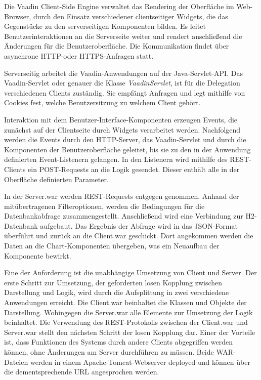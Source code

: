 Die Vaadin Client-Side Engine verwaltet das Rendering der Oberfläche im Web-Browser, durch den Einsatz verschiedener clientseitiger Widgets, die das Gegenstücke zu den serverseitigen Komponenten bilden. Es leitet Benutzerinteraktionen an die Serverseite weiter und rendert anschließend die Änderungen für die Benutzeroberfläche. Die Kommunikation findet über asynchrone HTTP-oder HTTPS-Anfragen statt.

Serverseitig arbeitet die Vaadin-Anwendungen auf der Java-Servlet-API. Das Vaadin-Servlet oder genauer die Klasse \textit{VaadinServlet}, ist für die Delegation verschiedenen Clients zuständig. Sie empfängt Anfragen und legt mithilfe von Cookies fest, welche Benutzersitzung zu welchem Client gehört.

Interaktion mit dem Benutzer-Interface-Komponenten erzeugen Events, die zunächst auf der Clientseite durch Widgets verarbeitet werden. Nachfolgend werden die Events durch den HTTP-Server, das Vaadin-Servlet und durch die Komponenten der Benutzeroberfläche geleitet, bis sie zu den in der Anwendung definierten Event-Listenern gelangen. In den Listenern wird mithilfe des REST-Clients ein POST-Requests an die Logik gesendet. Dieser enthält alle in der Oberfläche definierten Parameter. 

In der Server.war werden REST-Requests entgegen genommen. Anhand der mitübertragenen Filteroptionen, werden die Bedingungen für die Datenbankabfrage zusammengestellt. Anschließend wird eine Verbindung zur H2-Datenbank aufgebaut. Das Ergebnis der Abfrage wird in das JSON-Format überführt und zurück an die Client.war geschickt. Dort angekommen werden die Daten an die Chart-Komponenten übergeben, was ein Neuaufbau der Komponente bewirkt.      

Eine der Anforderung ist die unabhängige Umsetzung von Client und Server. Der erste Schritt zur Umsetzung, der geforderten losen Kopplung zwischen Darstellung und Logik, wird durch die Aufsplittung in zwei verschiedene Anwendungen erreicht. Die Client.war beinhaltet die Klassen und Objekte der Darstellung. Wohingegen die Server.war alle Elemente zur Umsetzung der Logik beinhaltet. Die Verwendung des REST-Protokolls zwischen der Client.war und Server.war stellt den nächsten Schritt der losen Kopplung dar. Einer der Vorteile ist, dass Funktionen des Systems durch andere Clients abgegriffen werden können, ohne Änderungen am Server durchführen zu müssen. Beide WAR-Dateien werden in einem Apache-Tomcat-Webserver deployed und können über die dementsprechende URL angesprochen werden.

